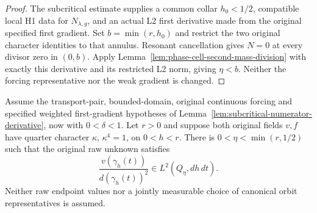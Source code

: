 \begin{proof}
\leanok
The subcritical estimate supplies a common collar $h_0<1/2$, compatible
local H1 data for $N_{\lambda,g}$, and an actual L2 first derivative made
from the original specified first gradient.
Set $b=\min(r,h_0)$ and restrict the two original character identities to
that annulus. Resonant cancellation gives $N=0$ at every divisor zero
in $(0,b)$. Apply Lemma~\ref{lem:phase-cell-second-mass-division} with
exactly this derivative and its restricted L2 norm, giving $\eta<b$.
Neither the forcing representative nor the weak gradient is changed.
\end{proof}

\begin{lemma}
\label{lem:subcritical-quarter-mass}
\leanok
Assume the transport-pair, bounded-domain, original continuous forcing and
specified weighted first-gradient hypotheses of
Lemma~\ref{lem:subcritical-numerator-derivative}, now with $0<\delta<1$.
Let $r>0$ and suppose both original fields $v,f$ have quarter character
$\kappa$, $\kappa^4=1$, on $0<h<r$.
There is $0<\eta<\min(r,1/2)$ such that the original raw unknown satisfies
\[
 \frac{v(\gamma_h(t))}{d(\gamma_h(t))^2}\in L^2(Q_\eta,dh\,dt).
\]
Neither raw endpoint values nor a jointly measurable choice of canonical
orbit representatives is assumed.
\end{lemma}

